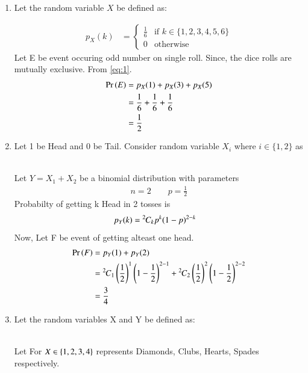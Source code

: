 \documentclass[journal,12pt,twocolumn]{IEEEtran}
\theoremstyle{remark}
\begin{document}
\begin{enumerate}
\item Let the random variable $X$ be defined as:
\begin{table}[!ht]
	
\end{table}
   \begin{align}
        p_X(k) &= 
        \begin{cases}
            \frac{1}{6} & \text{if }k \in \{1, 2, 3, 4, 5, 6\}\\
            0 & \text{otherwise}
        \end{cases}\label{eq:1}
    \end{align}
 Let E be event occuring odd number on single roll. Since, the dice rolls are mutually exclusive. From \eqref{eq:1}.
 \begin{align}
 \Pr\left(E\right)&=p_X(1)+p_X(3)+p_X(5)\\
 &=\frac{1}{6}+\frac{1}{6}+\frac{1}{6}\\
 &=\frac{1}{2} 
 \end{align}
 \item Let 1 be Head and 0 be Tail. Consider random variable $X_i$ where $i \in \{1,2\}$ as
 \begin{table}[!ht]
	
\end{table}\\
Let $Y=X_1+X_2$ be a binomial distribution with parameters
\begin{align}
n=2 \qquad p=\frac{1}{2}
\end{align}
Probabilty of getting k Head in 2 tosses is
\begin{align}
p_Y(k)&={{}^{2}\mkern-1muC_{k}}p^k(1-p)^{2-k}
\end{align}
Now, Let F be event of getting alteast one head.
\begin{align}
\Pr\left(F\right)&=p_Y(1)+p_Y(2)\\
&={{}^{2}\mkern-1muC_{1}}\left(\frac{1}{2}\right)^1\left(1-\frac{1}{2}\right)^{2-1}+{{}^{2}\mkern-1muC_{2}}\left(\frac{1}{2}\right)^2\left(1-\frac{1}{2}\right)^{2-2}\\
&=\frac{3}{4}
\end{align}
\item Let the random variables X and Y be defined as:
\begin{table}[!ht]
	
\end{table}\\
Let For $X \in \left\{1,2,3,4\right\}$ represents Diamonds, Clubs, Hearts, Spades respectively.
\begin{align}

\end{align}
\end{enumerate}
\end{document}
